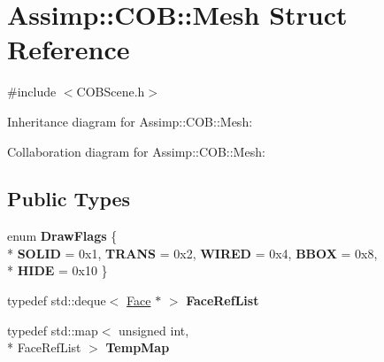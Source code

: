 \hypertarget{struct_assimp_1_1_c_o_b_1_1_mesh}{\section{Assimp\+:\+:C\+O\+B\+:\+:Mesh Struct Reference}
\label{struct_assimp_1_1_c_o_b_1_1_mesh}
}


{\ttfamily \#include $<$C\+O\+B\+Scene.\+h$>$}



Inheritance diagram for Assimp\+:\+:C\+O\+B\+:\+:Mesh\+:


Collaboration diagram for Assimp\+:\+:C\+O\+B\+:\+:Mesh\+:
\subsection*{Public Types}
\begin{DoxyCompactItemize}
\item 
\hypertarget{struct_assimp_1_1_c_o_b_1_1_mesh_ae26c2dc48acbcd6ffe03d126a6e2006e}{enum {\bfseries Draw\+Flags} \{ \\*
{\bfseries S\+O\+L\+I\+D} = 0x1, 
{\bfseries T\+R\+A\+N\+S} = 0x2, 
{\bfseries W\+I\+R\+E\+D} = 0x4, 
{\bfseries B\+B\+O\+X} = 0x8, 
\\*
{\bfseries H\+I\+D\+E} = 0x10
 \}}\label{struct_assimp_1_1_c_o_b_1_1_mesh_ae26c2dc48acbcd6ffe03d126a6e2006e}

\item 
\hypertarget{struct_assimp_1_1_c_o_b_1_1_mesh_a453fd63194dac226ae22f0eaffe6a4d6}{typedef std\+::deque$<$ \hyperlink{struct_assimp_1_1_c_o_b_1_1_face}{Face} $\ast$ $>$ {\bfseries Face\+Ref\+List}}\label{struct_assimp_1_1_c_o_b_1_1_mesh_a453fd63194dac226ae22f0eaffe6a4d6}

\item 
\hypertarget{struct_assimp_1_1_c_o_b_1_1_mesh_a0e6de4b049b71f7be63ff4ff393cd4ee}{typedef std\+::map$<$ unsigned int, \\*
Face\+Ref\+List $>$ {\bfseries Temp\+Map}}\label{struct_assimp_1_1_c_o_b_1_1_mesh_a0e6de4b049b71f7be63ff4ff393cd4ee}

\end{DoxyCompactItemize}
